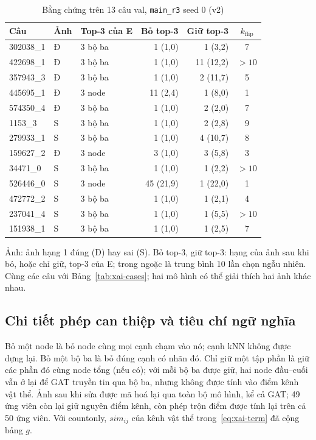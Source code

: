 \begin{table}[t]
  \caption{Bằng chứng trên 13 câu val, \texttt{main\_r3} seed 0 (v2)}
  \label{tab:xai-cases-mainr3}
  \centering
  \footnotesize
  \setlength{\tabcolsep}{3pt}
  \begin{tabular}{@{}lllrrc@{}}
    \toprule
    Câu & Ảnh & Top-3 của E & Bỏ top-3 & Giữ top-3 & $k_{\text{flip}}$ \\
    \midrule
    302038\_1 & Đ & 3 bộ ba & 1 (1,0) & 1 (3,2) & 7 \\
    422698\_1 & Đ & 3 bộ ba & 1 (1,0) & 11 (12,2) & $>10$ \\
    357943\_3 & Đ & 3 bộ ba & 1 (1,0) & 2 (11,7) & 5 \\
    445695\_1 & Đ & 3 node & 11 (2,4) & 1 (8,0) & 1 \\
    574350\_4 & Đ & 3 bộ ba & 1 (1,0) & 2 (2,0) & 7 \\
    1153\_3 & S & 3 bộ ba & 1 (1,0) & 2 (2,8) & 9 \\
    279933\_1 & S & 3 bộ ba & 1 (1,0) & 4 (10,7) & 8 \\
    159627\_2 & Đ & 3 node & 3 (1,0) & 3 (5,8) & 3 \\
    34471\_0 & S & 3 bộ ba & 1 (1,0) & 1 (2,2) & $>10$ \\
    526446\_0 & S & 3 node & 45 (21,9) & 1 (22,0) & 1 \\
    472772\_2 & S & 3 bộ ba & 1 (1,0) & 1 (2,1) & 4 \\
    237041\_4 & S & 3 bộ ba & 1 (1,0) & 1 (5,5) & $>10$ \\
    151938\_1 & S & 3 bộ ba & 1 (1,0) & 1 (2,5) & 7 \\
    \bottomrule
  \end{tabular}
  \par\smallskip
  {\scriptsize\raggedright
    Ảnh: ảnh hạng 1 đúng (Đ) hay sai (S). Bỏ top-3, giữ top-3: hạng của ảnh sau khi bỏ, hoặc chỉ giữ, top-3 của E; trong
    ngoặc là trung bình 10 lần chọn ngẫu nhiên. Cùng các câu với Bảng~\ref{tab:xai-cases}; hai mô hình có thể giải thích hai ảnh khác nhau.\par}
\end{table}

\subsection{Chi tiết phép can thiệp và tiêu chí ngữ nghĩa}
Bỏ một node là bỏ node cùng mọi cạnh chạm vào nó; cạnh kNN không được dựng lại. Bỏ một bộ ba là bỏ đúng cạnh có nhãn đó.
Chỉ giữ một tập phần là giữ các phần đó cùng node tổng (nếu có); với mỗi bộ ba được giữ, hai node đầu--cuối vẫn ở lại để
GAT truyền tin qua bộ ba, nhưng không được tính vào điểm kênh vật thể. Ảnh sau khi sửa được mã hoá lại qua toàn bộ mô hình,
kể cả GAT; 49 ứng viên còn lại giữ nguyên điểm kênh, còn phép trộn điểm được tính lại trên cả 50 ứng viên. Với countonly,
$\mathit{sim}_{ij}$ của kênh vật thể trong~\eqref{eq:xai-term} đã cộng bảng $g$.

